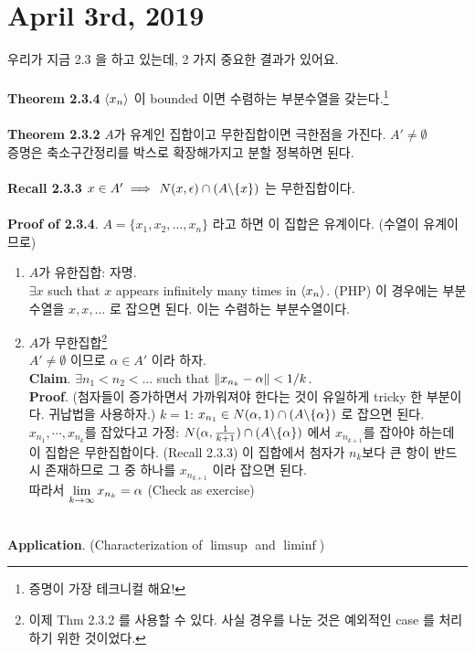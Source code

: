 \section*{April 3rd, 2019}
우리가 지금 2.3 을 하고 있는데, 2 가지 중요한 결과가 있어요.\\
\\
\textbf{Theorem 2.3.4} $\left\langle x_n \right\rangle$ 이 bounded 이면 수렴하는 부분수열을 갖는다.\footnote{증명이 가장 테크니컬 해요!}\\
\\
\textbf{Theorem 2.3.2} $A$가 유계인 집합이고 무한집합이면 극한점을 가진다. $A'\neq \emptyset$ \\
증명은 축소구간정리를 박스로 확장해가지고 분할 정복하면 된다.\\
\\
\textbf{Recall 2.3.3} $x \in A' \implies$ $N(x, \epsilon)\cap (A\backslash \{x\}) $ 는 무한집합이다.\\
\\
\textbf{Proof of 2.3.4}. $ A = \{x_1, x_2, \dots, x_n\} $ 라고 하면 이 집합은 유계이다. (수열이 유계이므로)
\begin{enumerate}
	\item $A$가 유한집합: 자명.\\
	$ \exists x$ such that $x$ appears infinitely many times in $\left\langle x_n \right\rangle$. (PHP) 이 경우에는 부분수열을 $x, x, \dots$ 로 잡으면 된다. 이는 수렴하는 부분수열이다.
	\item $ A $가 무한집합\footnote{이제 Thm 2.3.2 를 사용할 수 있다. 사실 경우를 나눈 것은 예외적인 case 를 처리하기 위한 것이었다.}\\
	$A'\neq \emptyset$ 이므로 $\alpha\in A'$ 이라 하자.\\
	\textbf{Claim}. $\exists n_1<n_2<\dots$ such that $\left\lVert x_{n_k}-\alpha\right\rVert < 1/k$.\\
	\textbf{Proof}. (첨자들이 증가하면서 가까워져야 한다는 것이 유일하게 tricky 한 부분이다. 귀납법을 사용하자.) $k=1$: $x_{n_1} \in N(\alpha, 1)\cap (A\backslash \{\alpha\})$ 로 잡으면 된다.\\
	$x_{n_1}, \cdots, x_{n_k}$를 잡았다고 가정: $N(\alpha, \frac{1}{k+1})\cap (A\backslash \{\alpha\})$ 에서 $x_{n_{k+1}}$를 잡아야 하는데 이 집합은 무한집합이다. (Recall 2.3.3) 이 집합에서 첨자가 $n_k$보다 큰 항이 반드시 존재하므로 그 중 하나를 $x_{n_{k+1}}$ 이라 잡으면 된다.\\
	따라서 $\displaystyle \lim_{k\rightarrow \infty} x_{n_k} = \alpha$ (Check as exercise)
\end{enumerate}~\\
\textbf{Application}. (Characterization of $\limsup$ and $\liminf$)\\

